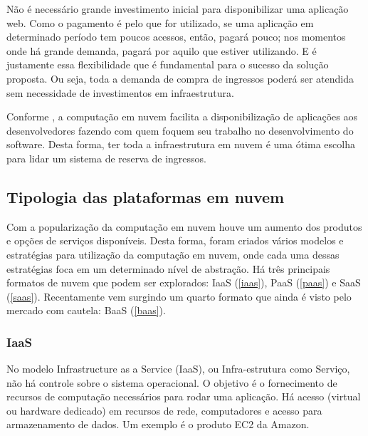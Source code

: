 Não é necessário grande investimento inicial para disponibilizar uma aplicação web.
Como o pagamento é pelo que for utilizado, se uma aplicação em determinado período tem
poucos acessos, então, pagará pouco; nos momentos onde há grande demanda, pagará por aquilo
que estiver utilizando. E é justamente essa flexibilidade que é fundamental para o sucesso
da solução proposta. Ou seja, toda a demanda de compra de ingressos poderá ser atendida
sem necessidade de investimentos em infraestrutura.

Conforme \cite{types-of-cloud-computing}, a computação em nuvem facilita a disponibilização
de aplicações aos desenvolvedores fazendo com quem foquem seu trabalho no desenvolvimento
do software.
Desta forma, ter toda a infraestrutura em nuvem é uma ótima escolha para lidar um sistema
de reserva de ingressos.


\subsection{Tipologia das plataformas em nuvem}\label{tipologia-das-plataformas-em-nuvem}

Com a popularização da computação em nuvem houve um aumento dos produtos e opções de
serviços disponíveis.
Desta forma, foram criados vários modelos e estratégias para utilização da computação
em nuvem, onde cada uma dessas estratégias foca em um determinado nível de abstração.
Há três principais formatos de nuvem que podem ser explorados:
IaaS (\autoref{iaas}), PaaS (\autoref{paas}) e SaaS (\autoref{saas}).
Recentamente vem surgindo um quarto formato que ainda é visto pelo mercado com
cautela: BaaS (\autoref{baas}).




\subsubsection{IaaS}\label{iaas}

No modelo Infrastructure as a Service (IaaS), ou Infra-estrutura como Serviço,
não há controle sobre o sistema operacional. O objetivo é o fornecimento
de recursos de computação necessários para rodar uma aplicação. Há acesso (virtual
ou hardware dedicado) em recursos de rede, computadores e acesso para armazenamento
de dados.
Um exemplo é o produto EC2 da Amazon.

